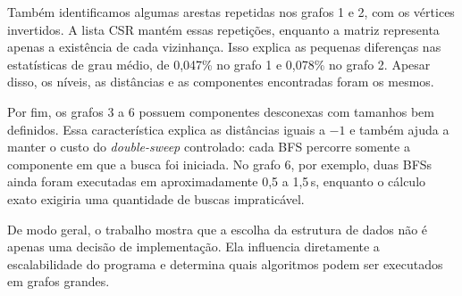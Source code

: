 \documentclass[11pt,a4paper]{article}
\begin{document}
Tamb\'em identificamos algumas arestas repetidas nos grafos 1 e 2, com os v\'ertices
invertidos. A lista CSR mant\'em essas repeti\c c\~oes, enquanto a matriz representa
apenas a exist\^encia de cada vizinhan\c ca. Isso explica as pequenas diferen\c cas nas
estat\'isticas de grau m\'edio, de 0,047\% no grafo 1 e 0,078\% no grafo 2. Apesar
disso, os n\'iveis, as dist\^ancias e as componentes encontradas foram os mesmos.

Por fim, os grafos 3 a 6 possuem componentes desconexas com tamanhos bem definidos.
Essa caracter\'istica explica as dist\^ancias iguais a $-1$ e tamb\'em ajuda a manter o
custo do \textit{double-sweep} controlado: cada BFS percorre somente a componente em
que a busca foi iniciada. No grafo 6, por exemplo, duas BFSs ainda foram executadas
em aproximadamente 0,5 a 1,5\,s, enquanto o c\'alculo exato exigiria uma quantidade
de buscas impratic\'avel.

De modo geral, o trabalho mostra que a escolha da estrutura de dados n\~ao \'e apenas
uma decis\~ao de implementa\c c\~ao. Ela influencia diretamente a escalabilidade do
programa e determina quais algoritmos podem ser executados em grafos grandes.
\end{document}
